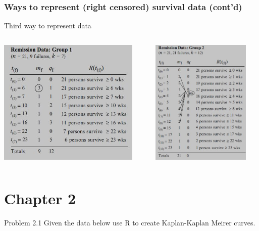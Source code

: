 \documentclass{beamer}
\theoremstyle{definition}
\begin{document}
\begin{frame}
\frametitle{Ways to represent (right censored) survival data (cont'd)}
\begin{block}{Third way to represent data }
\begin{columns}
    \begin{column}{0.48\textwidth}
        \includegraphics[width =\textwidth, height=6cm]{Ch1-leuk_data_a1.JPG}
    \end{column}
    \hspace{-10pt}
    \begin{column}{0.48\textwidth}
         \includegraphics[width =\textwidth, height=6cm]{Ch1-leuk_data_b1.JPG}
    \end{column}
\end{columns}
\end{block}
\end{frame}

\section{Chapter 2}
\begin{frame}
\begin{block}{Problem 2.1}
Given the data below use R to create Kaplan-Kaplan Meirer curves.
\end{block}
\end{frame}
\end{document}
